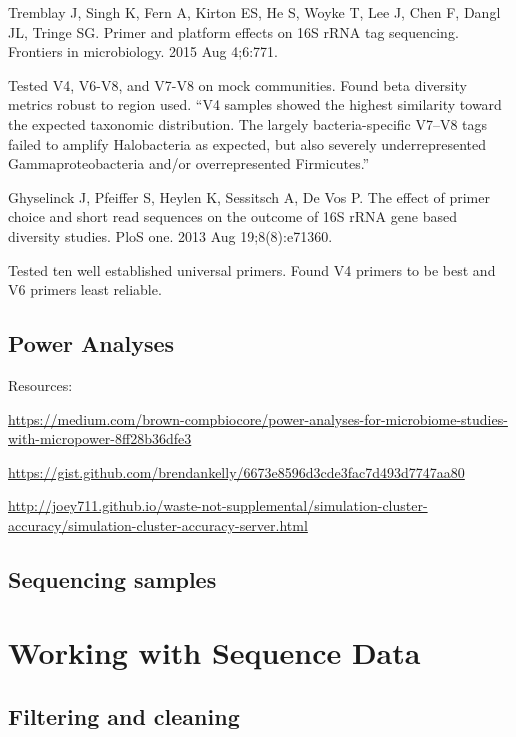 \documentclass[
]{book}
\begin{document}
Tremblay J, Singh K, Fern A, Kirton ES, He S, Woyke T, Lee J, Chen F, Dangl JL, Tringe SG. Primer and platform effects on 16S rRNA tag sequencing. Frontiers in microbiology. 2015 Aug 4;6:771.

Tested V4, V6-V8, and V7-V8 on mock communities. Found beta diversity metrics robust to region used. ``V4 samples showed the highest similarity toward the expected taxonomic distribution. The largely bacteria-specific V7--V8 tags failed to amplify Halobacteria as expected, but also severely underrepresented Gammaproteobacteria and/or overrepresented Firmicutes.''

Ghyselinck J, Pfeiffer S, Heylen K, Sessitsch A, De Vos P. The effect of primer choice and short read sequences on the outcome of 16S rRNA gene based diversity studies. PloS one. 2013 Aug 19;8(8):e71360.

Tested ten well established universal primers. Found V4 primers to be best and V6 primers least reliable.

\hypertarget{power-analyses}{%
\chapter{Power Analyses}\label{power-analyses}}

Resources:

\url{https://medium.com/brown-compbiocore/power-analyses-for-microbiome-studies-with-micropower-8ff28b36dfe3}

\url{https://gist.github.com/brendankelly/6673e8596d3cde3fac7d493d7747aa80}

\url{http://joey711.github.io/waste-not-supplemental/simulation-cluster-accuracy/simulation-cluster-accuracy-server.html}

\hypertarget{sequencing-samples}{%
\chapter{Sequencing samples}\label{sequencing-samples}}

\hypertarget{part-working-with-sequence-data}{%
\part{Working with Sequence Data}\label{part-working-with-sequence-data}}

\hypertarget{filtering-and-cleaning}{%
\chapter{Filtering and cleaning}\label{filtering-and-cleaning}}
\end{document}
